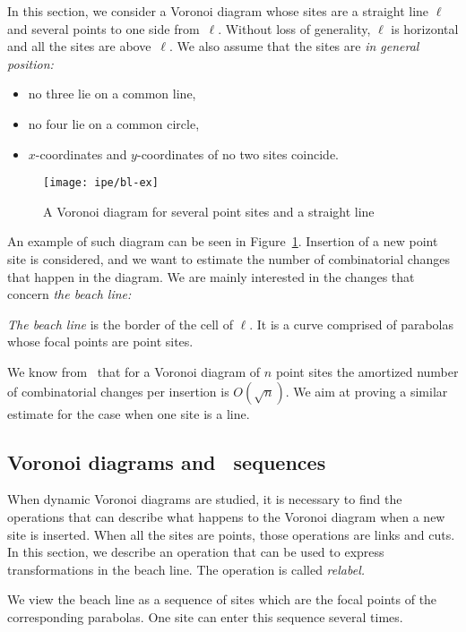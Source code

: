 In this section, we consider a Voronoi diagram whose sites are a straight line $\ell$ and several points to one side from~$\ell$. Without loss of generality, $\ell$ is horizontal and all the sites are above~$\ell$. We also assume that the sites are {\it in general position:} \begin{itemize}
	\item no three lie on a common line,
	\item no four lie on a common circle,
	\item $x$-coordinates and $y$-coordinates of no two sites coincide.
\end{itemize}

\begin{figure}[h] \centering
	\texttt{[image: ipe/bl-ex]}
	\caption{A Voronoi diagram for several point sites and a straight line}
	\label{fig:bl-ex}
\end{figure}

An example of such diagram can be seen in Figure~\ref{fig:bl-ex}. Insertion of a new point site is considered, and we want to estimate the number of combinatorial changes that happen in the diagram. We are mainly interested in the changes that concern {\it the beach line:}

\begin{definition}
	\emph{The beach line} is the border of the cell of $\ell$. It is a curve comprised of parabolas whose focal points are point sites.
\end{definition}

We know from~\cite{incremental-vd} that for a Voronoi diagram of $n$ point sites the amortized number of combinatorial changes per insertion is $O (\sqrt{n})$. We aim at proving a similar estimate for the case when one site is a line.

\subsection{Voronoi diagrams and \Ds~sequences}

When dynamic Voronoi diagrams are studied, it is necessary to find the operations that can describe what happens to the Voronoi diagram when a new site is inserted. When all the sites are points, those operations are links and cuts. In this section, we describe an operation that can be used to express transformations in the beach line. The operation is called {\it relabel.}

We view the beach line as a sequence of sites which are the focal points of the corresponding parabolas. One site can enter this sequence several times.

